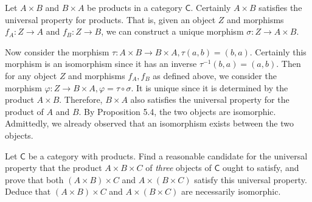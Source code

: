 \documentclass[../../master.tex]{subfiles}
\begin{document}
    \begin{solution}
      Let \(A \times B\) and \(B \times A\) be products in a category \(\mathsf{C}\).
      Certainly \(A \times B\) satisfies the universal property for products.
      That is, given an object \(Z\) and morphisms \(f_{A}: Z \to A\) and \(f_{B}: Z \to B\), we can construct a unique morphism
      \(\sigma: Z \to A \times B\).

      Now consider the morphism \(\tau: A \times B \to B \times A, \tau(a, b) = (b, a)\).
      Certainly this morphism is an isomorphism since it has an inverse \(\tau^{-1}(b, a) = (a, b)\).
      Then for any object \(Z\) and morphisms \(f_{A}, f_{B}\) as defined above, we consider the morphism
      \(\varphi: Z \to B \times A, \varphi = \tau \circ \sigma\).
      It is unique since it is determined by the product \(A \times B\).
      Therefore, \(B \times A\) also satisfies the universal property for the product of \(A\) and \(B\).
      By Proposition 5.4, the two objects are isomorphic.
      Admittedly, we already observed that an isomorphism exists between the two objects.
    \end{solution}

    \begin{problem}
      Let \(\mathsf{C}\) be a category with products.
      Find a reasonable candidate for the universal property that the product \(A \times B \times C\) of \textit{three} objects of \(\mathsf{C}\) ought to satisfy,
      and prove that both \((A \times B) \times C\) and \(A \times (B \times C)\) satisfy this universal property.
      Deduce that \((A \times B) \times C\) and \(A \times (B \times C)\) are necessarily isomorphic.
    \end{problem}
\end{document}
